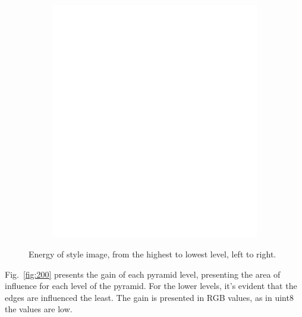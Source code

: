 \documentclass[a4paper]{iacas}
\begin{document}
\begin{figure}[!htbp]
\begin{subfigure}[b]{0.15\textwidth}
		\caption{}
		\label{fig:105}
	\end{subfigure}
	\begin{subfigure}[b]{0.15\textwidth}
		\includegraphics[width=\textwidth]{106.jpg}
		\caption{}
		\label{fig:106}
	\end{subfigure}
	
	\caption{Energy of style image, from the highest to lowest level, left to right.}
	\label{fig:100}
\end{figure}

Fig.~\ref{fig:200} presents the gain of each pyramid level, presenting the area of influence for each level of the pyramid. For the lower levels, it's evident that the edges are influenced the least. The gain is presented in RGB values, as in uint8 the values are low.
\end{document}
